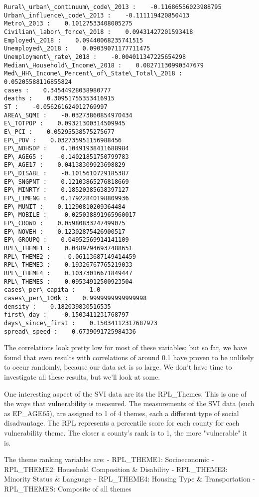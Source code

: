 \documentclass[11pt]{article}
\begin{document}
    \begin{Verbatim}[commandchars=\\\{\}]
Rural\_urban\_continuum\_code\_2013 :    -0.11686556023988795
Urban\_influence\_code\_2013 :    -0.111119420850413
Metro\_2013 :    0.10127533408005275
Civilian\_labor\_force\_2018 :    0.09431427201593418
Employed\_2018 :    0.09440068235741515
Unemployed\_2018 :    0.09039071177711475
Unemployment\_rate\_2018 :    -0.004011347225654298
Median\_Household\_Income\_2018 :    0.08271130990347679
Med\_HH\_Income\_Percent\_of\_State\_Total\_2018 :    0.05205588116855824
cases :    0.34544928038980777
deaths :    0.30951755353416915
ST :    -0.056261624012769997
AREA\_SQMI :    -0.03273860854970434
E\_TOTPOP :    0.09321300314509945
E\_PCI :    0.05295538575275677
EP\_POV :    0.032735951156988456
EP\_NOHSDP :    0.10491938411688984
EP\_AGE65 :    -0.14021851750799783
EP\_AGE17 :    0.04138309923698829
EP\_DISABL :    -0.1015610729185387
EP\_SNGPNT :    0.12103865276818669
EP\_MINRTY :    0.18520385638397127
EP\_LIMENG :    0.17922840198809936
EP\_MUNIT :    0.11290810209364484
EP\_MOBILE :    -0.025038891965960017
EP\_CROWD :    0.05980833247499075
EP\_NOVEH :    0.12302875426900517
EP\_GROUPQ :    0.04952569914141109
RPL\_THEME1 :    0.04897946937488651
RPL\_THEME2 :    -0.06113687149414459
RPL\_THEME3 :    0.19326767765219033
RPL\_THEME4 :    0.10373016671849447
RPL\_THEMES :    0.09534912500923504
cases\_per\_capita :    1.0
cases\_per\_100k :    0.9999999999999998
density :    0.182039830516535
first\_day :    -0.1503411231768797
days\_since\_first :    0.15034112317687973
spread\_speed :    0.6739091725984336

    \end{Verbatim}

    The correlations look pretty low for most of these variables; but so
far, we have found that even results with correlations of around 0.1
have proven to be unlikely to occur randomly, because our data set is so
large. We don't have time to investigate all these results, but we'll
look at some.

One interesting aspect of the SVI data are its the RPL\_Themes. This is
one of the ways that vulnerability is measured. The measurements of the
SVI data (such as EP\_AGE65), are assigned to 1 of 4 themes, each a
different type of social disadvantage. The RPL represents a percentile
score for each county for each vulnerability theme. The closer a
county's rank is to 1, the more "vulnerable" it is.

The theme ranking variables are: - RPL\_THEME1: Socioeconomic -
RPL\_THEME2: Household Composition \& Disability - RPL\_THEME3: Minority
Status \& Language - RPL\_THEME4: Housing Type \& Transportation -
RPL\_THEMES: Composite of all themes
\end{document}
